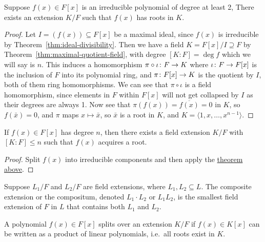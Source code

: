 \begin{theorem}\label{thm:field-extension-gain-root}
    Suppose \(f(x) \in F[x]\) is an irreducible polynomial of degree at least 2,
    There exists an extension \(K/F\) such that \(f(x)\) has roots in \(K\).
\end{theorem}
\begin{proof}
    Let \(I = (f(x)) \subseteq F[x]\) be a maximal ideal,
    since \(f(x)\) is irreducible by Theorem~\ref{thm:ideal-divisibility}.
    Then we have a field \(K = F[x]/I \supseteq F\)
    by Theorem~\ref{thm:maximal-quotient-field},
    with degree \([K:F] = \deg f\) which we will say is \(n\).
    This induces a homomorphism \(\pi\circ\iota\colon F\to K\)
    where \(\iota\colon F\to F[x]\) is the inclusion of \(F\) into its polynomial ring,
    and \(\pi\colon F[x]\to K\) is the quotient by \(I\),
    both of them ring homomorphisms.
    We can see that \(\pi\circ\iota\) is a field homomorphism,
    since elements in \(F\) within \(F[x]\) will not get collapsed by \(I\)
    as their degrees are always 1.
    Now see that \(\pi(f(x)) = \overline{f(x)} = 0\) in \(K\),
    so \(f(\bar{x}) = 0\), and \(\pi\) maps \(x \mapsto \bar{x}\),
    so \(\bar{x}\) is a root in \(K\),
    and \(K = \langle 1, x, \hdots, x^{n-1} \rangle\).
\end{proof}
\begin{corollary}
    If \(f(x) \in F[x]\) has degree \(n\),
    then there exists a field extension \(K/F\)
    with \([K:F] \leq n\) such that \(f(x)\) acquires a root.
\end{corollary}
\begin{proof}
    Split \(f(x)\) into irreducible components
    and then apply the \hyperref[thm:field-extension-gain-root]{theorem above}.
\end{proof}

\begin{definition}
    Suppose \(L_1/F\) and \(L_2/F\) are field extensions,
    where \(L_1,L_2 \subseteq L\).
    The composite extension or the compositum,
    denoted \(L_1 \cdot L_2\) or \(L_1 L_2\),
    is the smallest field extension of \(F\) in \(L\)
    that contains both \(L_1\) and \(L_2\).
\end{definition}

\begin{definition}
    A polynomial \(f(x) \in F[x]\) splits over an extension \(K/F\)
    if \(f(x) \in K[x]\) can be written as a product of linear polynomials,
    i.e.\ all roots exist in \(K\).
\end{definition}

